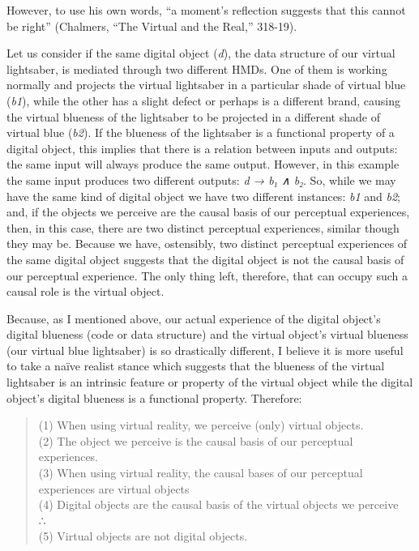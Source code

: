 \documentclass{article}
\begin{document}
However, to use his own words, ``a moment's reflection suggests that this cannot be right'' (Chalmers, ``The Virtual and the Real,'' 318-19).

Let us consider if the same digital object (\textit{d}), the data structure of our virtual lightsaber, is mediated through two different HMDs. One of them is working normally and projects the virtual lightsaber in a particular shade of virtual blue (\textit{b1}), while the other has a slight defect or perhaps is a different brand, causing the virtual blueness of the lightsaber to be projected in a different shade of virtual blue (\textit{b2}). If the blueness of the lightsaber is a functional property of a digital object, this implies that there is a relation between inputs and outputs: the same input will always produce the same output. However, in this example the same input produces two different outputs: \textit{d → b₁ ∧ b₂}. So, while we may have the same kind of digital object we have two different instances: \textit{b1} and \textit{b2}; and, if the objects we perceive are the causal basis of our perceptual experiences, then, in this case, there are two distinct perceptual experiences, similar though they may be. Because we have, ostensibly, two distinct perceptual experiences of the same digital object suggests that the digital object is not the causal basis of our perceptual experience. The only thing left, therefore, that can occupy such a causal role is the virtual object.

Because, as I mentioned above, our actual experience of the digital object’s digital blueness (code or data structure) and the virtual object’s virtual blueness (our virtual blue lightsaber) is so drastically different, I believe it is more useful to take a naïve realist stance which suggests that the blueness of the virtual lightsaber is an intrinsic feature or property of the virtual object while the digital object’s digital blueness is a functional property. Therefore:

\begin{quote}
(1) When using virtual reality, we perceive (only) virtual objects. \\
(2) The object we perceive is the causal basis of our perceptual experiences. \\
(3) When using virtual reality, the causal bases of our perceptual experiences are virtual objects \\
(4) Digital objects are the causal basis of the virtual objects we perceive \\
∴ \\
(5) Virtual objects are not digital objects.
\end{quote}
\end{document}
